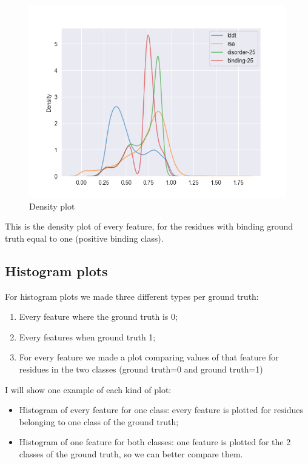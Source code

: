 \begin{figure}[h!]
    
    \includegraphics[scale=0.9]{res/analysis/plots/bind1-density_all.png}
    \caption{Density plot}
\end{figure}

This is the density plot of every feature, for the residues with binding ground truth equal to one (positive binding class).

\subsection{Histogram plots}

For histogram plots we made three different types per ground truth:

\begin{enumerate}
    \item Every feature where the ground truth is 0;
    \item Every features when ground truth 1;
    \item For every feature we made a plot comparing values of that feature for residues in the two classes (ground truth=0 and ground truth=1)
\end{enumerate}


I will show one example of each kind of plot: 

\begin{itemize}
    \item Histogram of every feature for one class: every feature is plotted for residues belonging to one class of the ground truth;
    \item Histogram of one feature for both classes: one feature is plotted for the 2 classes of the ground truth, so we can better compare them.
\end{itemize}

